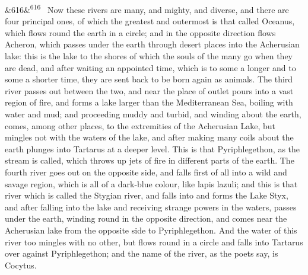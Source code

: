 \documentclass[12pt]{article}
\newcommand{\para}[1][]{\par\noindent\ifx&#1&\else\textsuperscript{\footnotesize #1}~\fi}
\begin{document}
\para[616] Now these rivers are many, and mighty, and diverse, and there are four principal ones, of which the greatest and outermost is that called Oceanus, which flows round the earth in a circle; and in the opposite direction flows Acheron, which passes under the earth through desert places into the Acherusian lake: this is the lake to the shores of which the souls of the many go when they are dead, and after waiting an appointed time, which is to some a longer and to some a shorter time, they are sent back to be born again as animals. The third river passes out between the two, and near the place of outlet pours into a vast region of fire, and forms a lake larger than the Mediterranean Sea, boiling with water and mud; and proceeding muddy and turbid, and winding about the earth, comes, among other places, to the extremities of the Acherusian Lake, but mingles not with the waters of the lake, and after making many coils about the earth plunges into Tartarus at a deeper level. This is that Pyriphlegethon, as the stream is called, which throws up jets of fire in different parts of the earth. The fourth river goes out on the opposite side, and falls first of all into a wild and savage region, which is all of a dark-blue colour, like lapis lazuli; and this is that river which is called the Stygian river, and falls into and forms the Lake Styx, and after falling into the lake and receiving strange powers in the waters, passes under the earth, winding round in the opposite direction, and comes near the Acherusian lake from the opposite side to Pyriphlegethon. And the water of this river too mingles with no other, but flows round in a circle and falls into Tartarus over against Pyriphlegethon; and the name of the river, as the poets say, is Cocytus.
\end{document}
